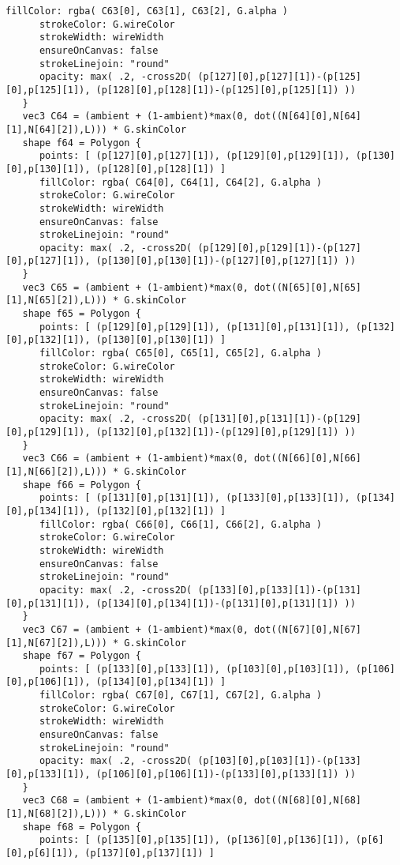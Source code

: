\begin{lstlisting}[language=Sty-RT,escapechar=@]
      fillColor: rgba( C63[0], C63[1], C63[2], G.alpha )
      strokeColor: G.wireColor
      strokeWidth: wireWidth
      ensureOnCanvas: false
      strokeLinejoin: "round"
      opacity: max( .2, -cross2D( (p[127][0],p[127][1])-(p[125][0],p[125][1]), (p[128][0],p[128][1])-(p[125][0],p[125][1]) ))
   }
   vec3 C64 = (ambient + (1-ambient)*max(0, dot((N[64][0],N[64][1],N[64][2]),L))) * G.skinColor
   shape f64 = Polygon {
      points: [ (p[127][0],p[127][1]), (p[129][0],p[129][1]), (p[130][0],p[130][1]), (p[128][0],p[128][1]) ]
      fillColor: rgba( C64[0], C64[1], C64[2], G.alpha )
      strokeColor: G.wireColor
      strokeWidth: wireWidth
      ensureOnCanvas: false
      strokeLinejoin: "round"
      opacity: max( .2, -cross2D( (p[129][0],p[129][1])-(p[127][0],p[127][1]), (p[130][0],p[130][1])-(p[127][0],p[127][1]) ))
   }
   vec3 C65 = (ambient + (1-ambient)*max(0, dot((N[65][0],N[65][1],N[65][2]),L))) * G.skinColor
   shape f65 = Polygon {
      points: [ (p[129][0],p[129][1]), (p[131][0],p[131][1]), (p[132][0],p[132][1]), (p[130][0],p[130][1]) ]
      fillColor: rgba( C65[0], C65[1], C65[2], G.alpha )
      strokeColor: G.wireColor
      strokeWidth: wireWidth
      ensureOnCanvas: false
      strokeLinejoin: "round"
      opacity: max( .2, -cross2D( (p[131][0],p[131][1])-(p[129][0],p[129][1]), (p[132][0],p[132][1])-(p[129][0],p[129][1]) ))
   }
   vec3 C66 = (ambient + (1-ambient)*max(0, dot((N[66][0],N[66][1],N[66][2]),L))) * G.skinColor
   shape f66 = Polygon {
      points: [ (p[131][0],p[131][1]), (p[133][0],p[133][1]), (p[134][0],p[134][1]), (p[132][0],p[132][1]) ]
      fillColor: rgba( C66[0], C66[1], C66[2], G.alpha )
      strokeColor: G.wireColor
      strokeWidth: wireWidth
      ensureOnCanvas: false
      strokeLinejoin: "round"
      opacity: max( .2, -cross2D( (p[133][0],p[133][1])-(p[131][0],p[131][1]), (p[134][0],p[134][1])-(p[131][0],p[131][1]) ))
   }
   vec3 C67 = (ambient + (1-ambient)*max(0, dot((N[67][0],N[67][1],N[67][2]),L))) * G.skinColor
   shape f67 = Polygon {
      points: [ (p[133][0],p[133][1]), (p[103][0],p[103][1]), (p[106][0],p[106][1]), (p[134][0],p[134][1]) ]
      fillColor: rgba( C67[0], C67[1], C67[2], G.alpha )
      strokeColor: G.wireColor
      strokeWidth: wireWidth
      ensureOnCanvas: false
      strokeLinejoin: "round"
      opacity: max( .2, -cross2D( (p[103][0],p[103][1])-(p[133][0],p[133][1]), (p[106][0],p[106][1])-(p[133][0],p[133][1]) ))
   }
   vec3 C68 = (ambient + (1-ambient)*max(0, dot((N[68][0],N[68][1],N[68][2]),L))) * G.skinColor
   shape f68 = Polygon {
      points: [ (p[135][0],p[135][1]), (p[136][0],p[136][1]), (p[6][0],p[6][1]), (p[137][0],p[137][1]) ]

\end{lstlisting}
